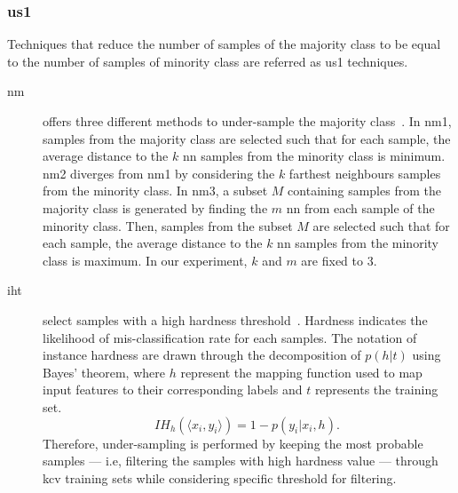 \subsubsection{\Acl*{us1}}
Techniques that reduce the number of samples of the majority class to be equal to the number of samples of minority class are referred as \ac{us1} techniques.

\begin{description}
  \item[\Ac{nm}] offers three different methods to under-sample the majority class~\cite{mani2003knn}.
In \ac{nm1}, samples from the majority class are selected such that for each sample, the average distance to the $k$ \ac{nn} samples from the minority class is minimum.
\ac{nm2} diverges from \ac{nm1} by considering the $k$ farthest neighbours samples from the minority class.
In \ac{nm3}, a subset $M$ containing samples from the majority class is generated by finding the $m$ \ac{nn} from each sample of the minority class.
Then, samples from the subset $M$ are selected such that for each sample, the average distance to the $k$ \ac{nn} samples from the minority class is maximum.
In our experiment, $k$ and $m$ are fixed to 3.
\item[\Ac{iht}] select samples with a high hardness threshold~\cite{smith2014instance}.
Hardness indicates the likelihood of mis-classification rate for each samples.
The notation of instance hardness are drawn through the decomposition of $p(h \vert t)$ using Bayes' theorem, where $h$ represent the mapping function used to map input features to their corresponding labels and $t$ represents the training set.
\begin{equation}
  IH_h(\langle x_{i}, y_{i}\rangle) = 1 - p(y_i \vert x_i, h).\
\label{eq:iht}
\end{equation}
Therefore, under-sampling is performed by keeping the most probable samples --- i.e, filtering the samples with high hardness value --- through \ac{kcv} training sets while considering specific threshold for filtering.

 
\end{description}

